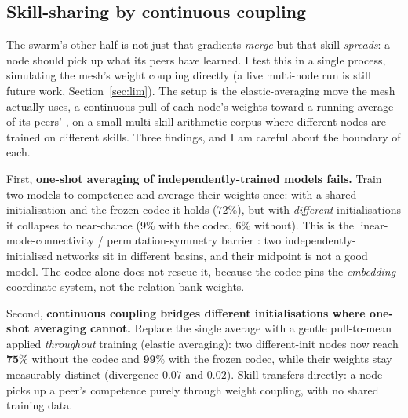 \documentclass[11pt]{article}
\begin{document}
\subsection{Skill-sharing by continuous coupling}\label{sec:skillshare}

The swarm's other half is not just that gradients \emph{merge} but that skill \emph{spreads}: a node
should pick up what its peers have learned. I test this in a single process, simulating the mesh's weight
coupling directly (a live multi-node run is still future work, Section~\ref{sec:lim}). The setup is the
elastic-averaging move the mesh actually uses, a continuous pull of each node's weights toward a running
average of its peers' \parencite{zhang2015easgd,mcmahan2017fedavg}, on a small multi-skill arithmetic
corpus where different nodes are trained on different skills. Three findings, and I am careful about the
boundary of each.

First, \textbf{one-shot averaging of independently-trained models fails.} Train two models to competence
and average their weights once: with a shared initialisation and the frozen codec it holds ($72\%$), but
with \emph{different} initialisations it collapses to near-chance ($9\%$ with the codec, $6\%$ without).
This is the linear-mode-connectivity / permutation-symmetry barrier \parencite{ainsworth2023rebasin}: two
independently-initialised networks sit in different basins, and their midpoint is not a good model. The
codec alone does not rescue it, because the codec pins the \emph{embedding} coordinate system, not the
relation-bank weights.

Second, \textbf{continuous coupling bridges different initialisations where one-shot averaging cannot.}
Replace the single average with a gentle pull-to-mean applied \emph{throughout} training (elastic
averaging): two different-init nodes now reach $\mathbf{75\%}$ without the codec and $\mathbf{99\%}$ with
the frozen codec, while their weights stay measurably distinct (divergence $0.07$ and $0.02$). Skill
transfers directly: a node picks up a peer's competence purely through weight coupling, with no shared
training data.
\end{document}
